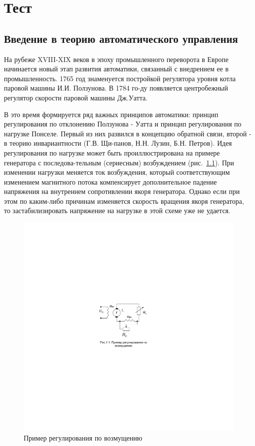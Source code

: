 \chapter{Тест}
\section{Введение в теорию автоматического управления}
На рубеже XVIII-XIX веков в эпоху промышленного переворота в Европе начинается новый этап развития автоматики, связанный с внедрением ее в промышленность. 1765 год знаменуется постройкой регулятора уровня котла паровой машины И.И. Ползунова. В 1784 го-ду появляется центробежный регулятор скорости паровой машины Дж.Уатта.

В это время формируется ряд важных принципов автоматики: принцип регулирования по отклонению Ползунова - Уатта и принцип регулирования по нагрузке Понселе. Первый из них развился в концепцию обратной связи, второй - в теорию инвариантности (Г.В. Щи-панов, Н.Н. Лузин, Б.Н. Петров). Идея регулирования по нагрузке может быть проиллюстрирована на примере генератора с последова-тельным (сериесным) возбуждением (рис.~\ref{fig:regpovozmusheniu}). При изменении нагрузки меняется ток возбуждения, который соответствующим изменением магнитного потока компенсирует дополнительное падение напряжения на внутреннем сопротивлении якоря генератора. Однако если при этом по каким-либо причинам изменяется скорость вращения якоря генератора, то застабилизировать напряжение на нагрузке в этой схеме уже не удается.

\begin{figure}[h]
	\centering
	\includegraphics[scale=0.95]{images/RegPoVozmusheniu}
	\caption{Пример регулирования по возмущению }
	\label{fig:regpovozmusheniu}
\end{figure}

